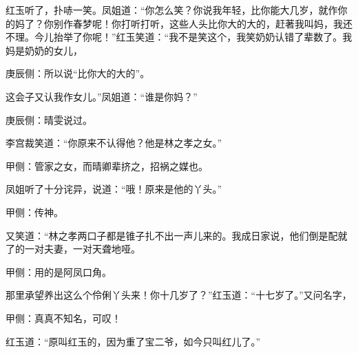 \begin{parag}
    红玉听了，扑哧一笑。凤姐道：“你怎么笑？你说我年轻，比你能大几岁，就作你的妈了？你别作春梦呢！你打听打听，这些人头比你大的大的，赶著我叫妈，我还不理。今儿抬举了你呢！”红玉笑道：“我不是笑这个，我笑奶奶认错了辈数了。我妈是奶奶的女儿，\begin{note}庚辰侧：所以说“比你大的大的”。\end{note}这会子又认我作女儿。”凤姐道：“谁是你妈？”\begin{note}庚辰侧：晴雯说过。\end{note}李宫裁笑道：“你原来不认得他？他是林之孝之女。”\begin{note}甲侧：管家之女，而晴卿辈挤之，招祸之媒也。\end{note}凤姐听了十分诧异，说道：“哦！原来是他的丫头。”\begin{note}甲侧：传神。\end{note}又笑道：“林之孝两口子都是锥子扎不出一声儿来的。我成日家说，他们倒是配就了的一对夫妻，一对天聋地哑。\begin{note}甲侧：用的是阿凤口角。\end{note}那里承望养出这么个伶俐丫头来！你十几岁了？”红玉道：“十七岁了。”又问名字，\begin{note}甲侧：真真不知名，可叹！\end{note}红玉道：“原叫红玉的，因为重了宝二爷，如今只叫红儿了。”
\end{parag}


